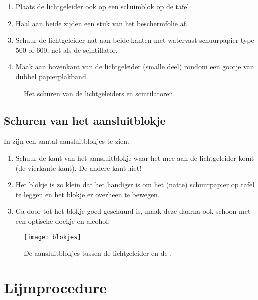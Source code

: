 \begin{enumerate}
    \item Plaats de lichtgeleider ook op een schuimblok op de tafel.
    \item Haal aan beide zijden een stuk van het beschermfolie af.
    \item Schuur de lichtgeleider nat aan beide kanten met watervast
    schuurpapier type 500 of 600, net als de scintillator.
    \item Maak aan bovenkant van de lichtgeleider (smalle deel) rondom
    een gootje van dubbel papierplakband.
\end{enumerate}

\begin{figure}
    \centering
    \caption{Het schuren van de lichtgeleiders en scintilatoren.}
\end{figure}


\subsection{Schuren van het aansluitblokje}

In  zijn een aantal aansluitblokjes te zien.

\begin{enumerate}
    \item Schuur de kant van het aansluitblokje waar het mee aan de
    lichtgeleider komt (de vierkante kant). De andere kant niet!
    \item Het blokje is zo klein dat het handiger is om het (natte)
    schuurpapier op tafel te leggen en het blokje er overheen te bewegen.
    \item Ga door tot het blokje goed geschuurd is, maak deze daarna ook
    schoon met een optische doekje en alcohol.
\end{enumerate}

\begin{figure}
    \centering
    \texttt{[image: blokjes]}
    \caption{De aansluitblokjes tussen de lichtgeleider en de \pmt.}
    \label{fig:blokjes}
\end{figure}


\section{Lijmprocedure}

